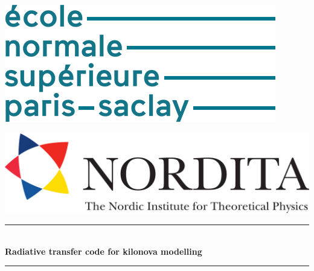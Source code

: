 \documentclass[a4paper, twoside, 11pt]{article}
\numberwithin{equation}{section}
\begin{document}
\thispagestyle{empty}
\begin{center}
\vspace*{50pt}
\newcommand{\HRule}{\rule{\linewidth}{0.5mm}}	
\begin{minipage}{0.50\textwidth}
    \begin{flushleft}
    \includegraphics[scale = 0.40]{pictures/logo_ens_cachan.png}
    \end{flushleft}
\end{minipage}
\begin{minipage}{0.40\textwidth} 
    \begin{flushright}
   \includegraphics[scale = 0.18]{pictures/logo_uni.pdf}
    \end{flushright}
\end{minipage}
\vspace{100pt}




\vspace*{10 pt}

\HRule \\[1 cm]	
{ \huge \bfseries Radiative transfer code for kilonova modelling}\\[0.4cm]	 																	
\HRule \\[1cm]	



\end{center}
\end{document}
